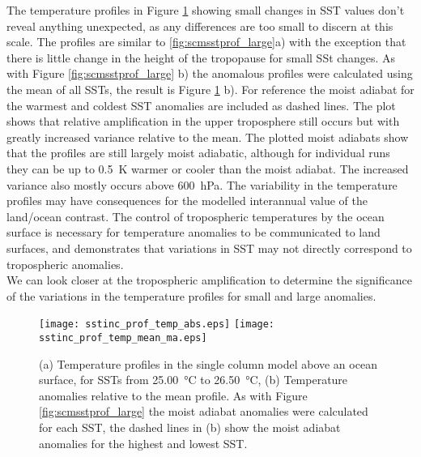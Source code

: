 The temperature profiles in Figure \ref{fig:scmsstinc_prof} showing small 
changes in SST values don't reveal anything unexpected, as any differences are 
too small to discern at this scale. The profiles are similar to 
\ref{fig:scmsstprof_large}a) with the exception that there is little change in 
the height of the tropopause for small SSt changes. As with Figure 
\ref{fig:scmsstprof_large} b) the anomalous profiles were calculated using the 
mean of all SSTs, the result is Figure \ref{fig:scmsstinc_prof} b). For 
reference the moist adiabat for the warmest and coldest SST anomalies are 
included as dashed lines. The plot shows that relative amplification in the 
upper troposphere still occurs but with greatly increased variance relative to 
the mean. The plotted moist adiabats show that the profiles are still largely 
moist adiabatic, although for individual runs they can be up to 
\SI{0.5}{\kelvin} warmer or cooler than the moist adiabat. The increased 
variance also mostly occurs above \SI{600}{\hecto\pascal}. The variability in 
the temperature profiles may have consequences for the modelled interannual 
value of the land/ocean contrast. The control of tropospheric temperatures by 
the ocean surface is necessary for temperature anomalies to be communicated to 
land surfaces, and demonstrates that variations in SST may not directly 
correspond to tropospheric anomalies.\\
We can look closer at the tropospheric amplification to determine the 
significance of the variations in the temperature profiles for small and large 
anomalies.


\begin{figure}[ht]
\texttt{[image: sstinc\_prof\_temp\_abs.eps]}
\texttt{[image: sstinc\_prof\_temp\_mean\_ma.eps]}
\caption{(a) Temperature profiles in the single column model above an ocean 
surface, for SSTs from \SI{25.00}{\degreeCelsius} to \SI{26.50}{\degreeCelsius}, 
(b) Temperature anomalies relative to the mean profile. As with Figure 
\ref{fig:scmsstprof_large} the moist adiabat anomalies were calculated for each 
SST, the dashed lines in (b) show the moist adiabat anomalies for the highest 
and lowest SST.}
\label{fig:scmsstinc_prof}
\end{figure}

